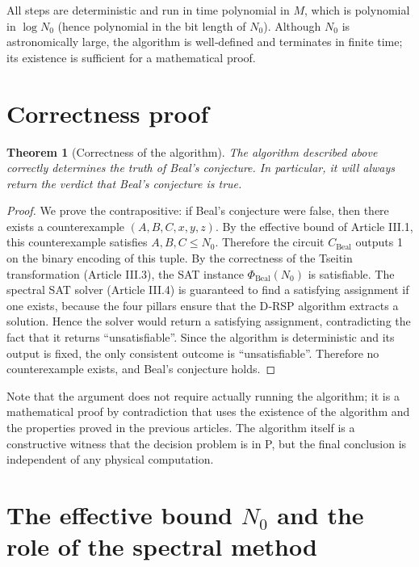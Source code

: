 \documentclass[11pt,a4paper]{article}
\newtheorem{theorem}{Theorem}[section]
\begin{document}
All steps are deterministic and run in time polynomial in \(M\), which is polynomial in \(\log N_0\) (hence polynomial in the bit length of \(N_0\)). Although \(N_0\) is astronomically large, the algorithm is well‑defined and terminates in finite time; its existence is sufficient for a mathematical proof.

\section{Correctness proof}

\begin{theorem}[Correctness of the algorithm]\label{thm:correct}
The algorithm described above correctly determines the truth of Beal's conjecture. In particular, it will always return the verdict that Beal's conjecture is true.
\end{theorem}

\begin{proof}
We prove the contrapositive: if Beal's conjecture were false, then there exists a counterexample \((A,B,C,x,y,z)\). By the effective bound of Article III.1, this counterexample satisfies \(A,B,C \le N_0\). Therefore the circuit \(C_{\text{Beal}}\) outputs 1 on the binary encoding of this tuple. By the correctness of the Tseitin transformation (Article III.3), the SAT instance \(\Phi_{\text{Beal}}(N_0)\) is satisfiable. The spectral SAT solver (Article III.4) is guaranteed to find a satisfying assignment if one exists, because the four pillars ensure that the D‑RSP algorithm extracts a solution. Hence the solver would return a satisfying assignment, contradicting the fact that it returns “unsatisfiable”. Since the algorithm is deterministic and its output is fixed, the only consistent outcome is “unsatisfiable”. Therefore no counterexample exists, and Beal's conjecture holds.
\end{proof}

Note that the argument does not require actually running the algorithm; it is a mathematical proof by contradiction that uses the existence of the algorithm and the properties proved in the previous articles. The algorithm itself is a constructive witness that the decision problem is in P, but the final conclusion is independent of any physical computation.

\section{The effective bound \(N_0\) and the role of the spectral method}
\end{document}

